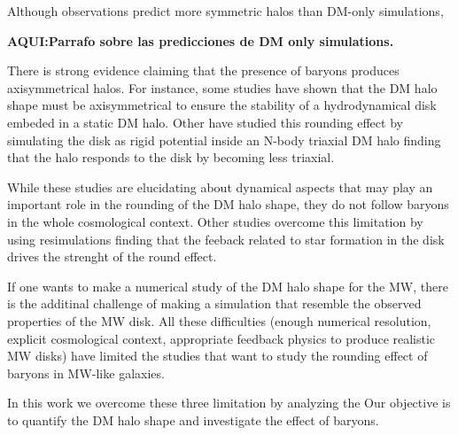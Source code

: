 \documentclass[a4paper,fleqn,usenatbib]{mnras}
\begin{document}
Although observations predict more symmetric halos than DM-only
simulations, 

{\bf AQUI:Parrafo sobre las predicciones de DM only simulations.} 

There is strong evidence claiming that the presence of
baryons produces axisymmetrical halos. 
For instance, some studies have shown that the DM halo shape must be
axisymmetrical to ensure the stability of a hydrodynamical disk
embeded in a static DM halo. 
Other have studied this rounding effect by simulating the disk as rigid
potential inside an N-body triaxial DM
halo \cite{Debattista_et_al._2008,Debattista_et_al._2013,Kazantzidis_et_al._2010}
finding that the halo responds to the disk by becoming less triaxial. 

While these studies are elucidating about dynamical aspects that may
play an important role in the rounding of the DM halo shape, they do not
follow baryons in the whole cosmological context. 
Other studies overcome this limitation by using resimulations 
\citep{Abadi_et_al._2010,Bryan_et_al._2013} finding that the
feeback related to star formation in the disk drives the strenght of
the round effect. 


If one wants to make a numerical study of the DM halo shape for the
MW, there is the additinal challenge of making a simulation that
resemble the observed properties of the MW disk.
All these difficulties (enough numerical resolution, explicit
cosmological context, appropriate feedback physics to produce
realistic MW disks) have limited the studies that want to study the
rounding effect of baryons in MW-like galaxies.


In this work we overcome these three limitation by analyzing the
Our objective is to quantify the DM halo shape and investigate the
effect of baryons.


\end{document}
